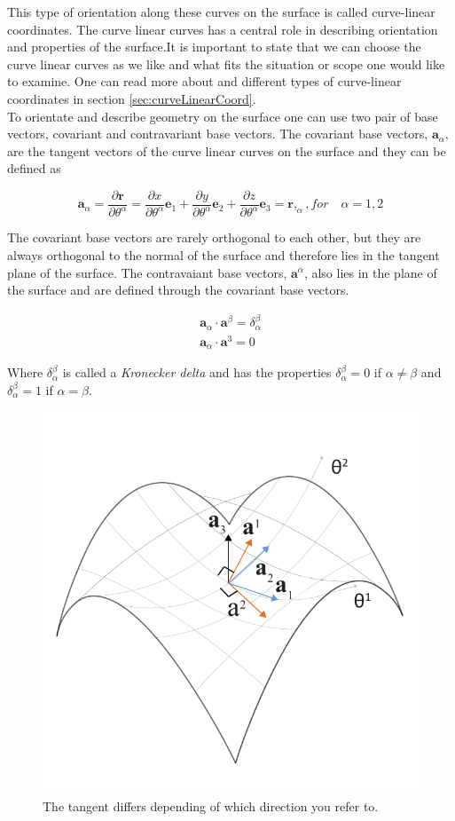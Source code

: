 This type of orientation along these curves on the surface is called curve-linear coordinates. The curve linear curves has a central role in describing orientation and properties of the surface.It is important to state that we can choose the curve linear curves as we like and what fits the situation or scope one would like to examine. One can read more about and different types of curve-linear coordinates in section \ref{sec:curveLinearCoord}.\\
To orientate and describe geometry on the surface one can use two pair of base vectors, covariant and contravariant base vectors. The covariant base vectors, $\textbf{a}_\alpha$, are the tangent vectors of the curve linear curves on the surface and they can be defined as

\begin{equation} \label{convariantDiff}
 \textbf{a}_\alpha = \frac{\partial\textbf{r}}{\partial \theta^\alpha } = \frac{\partial x}{\partial \theta^\alpha }\textbf{e}_1 + \frac{\partial y}{\partial \theta^\alpha }\textbf{e}_2+\frac{\partial z}{\partial \theta^\alpha }\textbf{e}_3 = \textbf{r},_{\alpha} , for\quad \alpha = 1,2
\end{equation}


The covariant base vectors are rarely orthogonal to each other, but they are always orthogonal to the normal of the surface and therefore lies in the tangent plane of the surface. The contravaiant base vectors, $\textbf{a}^\alpha$, also lies in the plane of the surface and are defined through the covariant base vectors.


\begin{align}
\textbf{a}_{\alpha} \cdot \textbf{a}^\beta = \delta^{\beta}_\alpha \\
\textbf{a}_{\alpha} \cdot \textbf{a}^3 = 0    
\end{align}

Where $\delta^{\beta}_\alpha$ is called a \textit{Kronecker delta} and has the properties $\delta^{\beta}_\alpha = 0$ if $\alpha \neq  \beta$ and $\delta^{\beta}_\alpha = 1$ if $\alpha =  \beta$. 
 
\begin{figure}[H]
\centering
\includegraphics[width=0.7\linewidth ]{figure/Theory/surfGeometry2.pdf}
\caption{The tangent differs depending of which direction you refer to. }
\end{figure}
 
